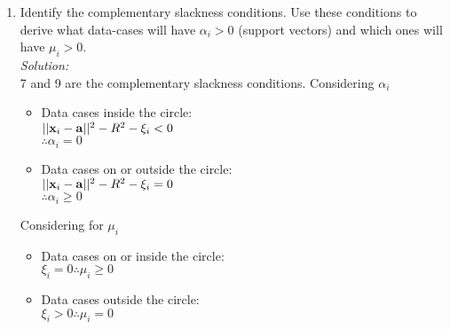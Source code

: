 \documentclass[12pt,a4paper]{article}
\newcommand{\xscalar}{x}
\newcommand{\xvec}{{\bf \xscalar}}
\newcommand{\avec}{\mathbf{a}}
\begin{document}
\begin{enumerate}
\item Identify the complementary slackness conditions. Use these conditions to derive what data-cases will have $\alpha_i>0$ (support vectors) and which ones will have $\mu_i>0$. \\
	\emph{Solution:} \\
		7 and 9 are the complementary slackness conditions. 
		Considering $\alpha_i$
			\begin{itemize}
				\item Data cases inside the circle: \\
					$||\xvec_i - \avec||^2 - R^2 - \xi_i < 0$ \\
					$\therefore \alpha_i = 0$
				\item Data cases on or outside the circle: \\
					$||\xvec_i - \avec||^2 - R^2 - \xi_i = 0$ \\
					$\therefore \alpha_i \geqslant 0$
			\end{itemize}

		Considering for $\mu_i$
			\begin{itemize}
				\item Data cases on or inside the circle: \\
				$\xi_i = 0 \therefore \mu_i \geqslant 0$
				\item Data cases outside the circle: \\
				$\xi_i > 0 \therefore \mu_i = 0$
			\end{itemize}


\end{enumerate}
\end{document}

